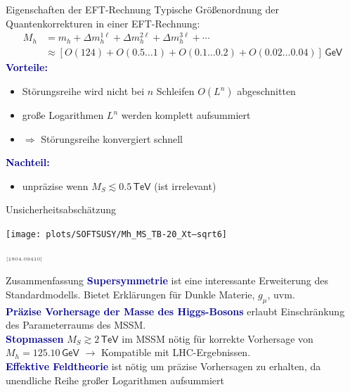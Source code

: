 \documentclass[hyperref={pdfpagelabels=false},ngerman]{beamer}
\newcommand{\eh}[1]{\,\mathsf{#1}}
\newcommand{\MS}{\ensuremath{M_S}}
\newcommand{\mycite}[1]{\ensuremath{\text{\textcolor{darkgray}{\tiny [#1]}}}}
\renewcommand{\emph}[1]{\textbf{\textcolor{darkblue}{#1}}}
\newcommand{\GeV}{\eh{GeV}}
\newcommand{\TeV}{\eh{TeV}}
\begin{document}
\begin{frame}{Eigenschaften der EFT-Rechnung}
  Typische Größenordnung der Quantenkorrekturen in einer EFT-Rechnung:
  \begin{align*}
    M_h &= m_h + \Delta m_h^{1\ell} + \Delta m_h^{2\ell} + \Delta m_h^{3\ell} + \cdots \\
    &\approx [O(124) + O(0.5\ldots 1) + O(0.1\ldots 0.2) + O(0.02\ldots 0.04)] \eh{GeV}
  \end{align*}
  \emph{Vorteile:}
  \begin{itemize}
  \item Störungsreihe wird nicht bei $n$ Schleifen $O(L^n)$
    abgeschnitten
  \item große Logarithmen $L^n$ werden komplett aufsummiert
  \item $\Rightarrow$ Störungsreihe konvergiert schnell
  \end{itemize}
  \vspace*{1em}
  \emph{Nachteil:}
  \begin{itemize}
  \item unpräzise wenn  $\MS \lesssim 0.5\TeV$
    (ist irrelevant)
  \end{itemize}
\end{frame}

\begin{frame}{Unsicherheitsabschätzung}
  \begin{center}
    \texttt{[image: plots/SOFTSUSY/Mh\_MS\_TB-20\_Xt--sqrt6]}
  \end{center}
  \raggedleft\mycite{1804.09410}
\end{frame}


\begin{frame}{Zusammenfassung}
  \emph{Supersymmetrie} ist eine interessante Erweiterung des
  Standardmodells.  Bietet Erklärungen für Dunkle Materie,
  $g_\mu$, uvm.
  \\[1em]
  \emph{Präzise Vorhersage der Masse des Higgs-Bosons} erlaubt
  Einschränkung des Parameterraums des MSSM.
  \\[1em]
  \emph{Stopmassen} $\MS \gtrsim 2\TeV$ im MSSM nötig für korrekte
  Vorhersage von $M_h = 125.10\GeV$ $\rightarrow$ Kompatible mit LHC-Ergebnissen.
  \\[1em]
  \emph{Effektive Feldtheorie} ist nötig um präzise Vorhersagen zu
  erhalten, da unendliche Reihe großer Logarithmen aufsummiert
\end{frame}
\end{document}
